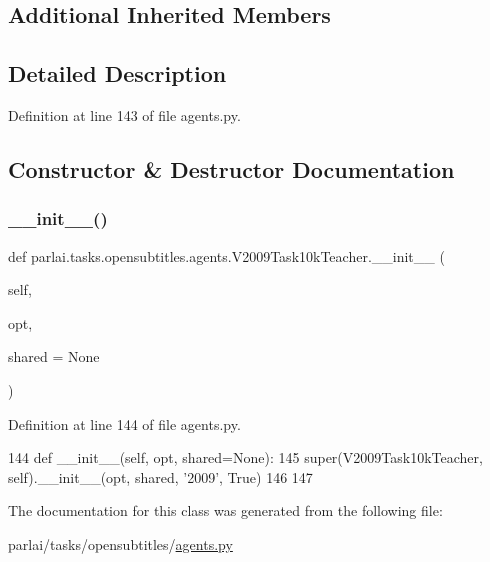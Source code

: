 \subsection*{Additional Inherited Members}


\subsection{Detailed Description}


Definition at line 143 of file agents.\+py.



\subsection{Constructor \& Destructor Documentation}
\mbox{\label{classparlai_1_1tasks_1_1opensubtitles_1_1agents_1_1V2009Task10kTeacher_af0a8a8e3a7a2c7b7cea42965f8b08afc}} 
\subsubsection{\texorpdfstring{\+\_\+\+\_\+init\+\_\+\+\_\+()}{\_\_init\_\_()}}
{\footnotesize\ttfamily def parlai.\+tasks.\+opensubtitles.\+agents.\+V2009\+Task10k\+Teacher.\+\_\+\+\_\+init\+\_\+\+\_\+ (\begin{DoxyParamCaption}\item[{}]{self,  }\item[{}]{opt,  }\item[{}]{shared = {\ttfamily None} }\end{DoxyParamCaption})}



Definition at line 144 of file agents.\+py.


\begin{DoxyCode}
144     \textcolor{keyword}{def }\_\_init\_\_(self, opt, shared=None):
145         super(V2009Task10kTeacher, self).\_\_init\_\_(opt, shared, \textcolor{stringliteral}{'2009'}, \textcolor{keyword}{True})
146 
147 
\end{DoxyCode}


The documentation for this class was generated from the following file\+:\begin{DoxyCompactItemize}
\item 
parlai/tasks/opensubtitles/\hyperlink{parlai_2tasks_2opensubtitles_2agents_8py}{agents.\+py}\end{DoxyCompactItemize}
